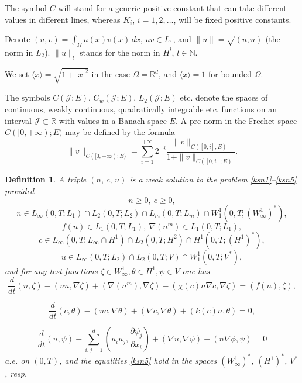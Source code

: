 \documentclass[10pt]{amsart}
\newtheorem{preremark2}{Definition}[section]
\newenvironment{defn}
  {\begin{preremark2}\rm}{\end{preremark2}}
\begin{document}
The symbol $C$ will stand for a generic positive constant that can take different values in different lines, whereas $K_i$, $i=1,2,\dots$, will be fixed positive constants.

Denote $(u,v)=\int_\Omega u(x)v(x)\,dx$, $uv\in L_1$, and $\|u\|=\sqrt{(u,u)}$ (the norm in $L_2$). $\|u\|_l$ stands for the norm in $H^l$, $l\in \mathbb{N}$.

We set ${\langle x \rangle}=\sqrt{1+|x|^2}$ in the case $\Omega={\mathbb{R}}^d$, and ${\langle x \rangle}=1$ for bounded $\Omega$. 

The symbols $C (\mathcal{J}; E) $, $C_w(\mathcal{J}; E)$, $L_2
(\mathcal{J}; E) $ etc. denote the spaces of continu\-ous, weakly continu\-ous, quadratically integrable etc. functions on an interval
$\mathcal{J}\subset \mathbb {R} $ with
values in a Banach space $E $. A pre-norm in the Frechet space $C ([0, +
\infty); E) $ may be defined by the formula
$$ \| v \| _{C ([0, +\infty);E)} =\sum\limits _ {i=1} ^ {+ \infty} 2 ^ {-i} \frac {\|v \| _ {C ([0, i]; E)}} {1 + \| v \| _ {C ([0, i]; E)}}. $$

\begin{defn}\label{defweak}
A triple $(n,\, c,\, u)$ is a \emph{weak
solution} to the problem \eqref{ksn1}--\eqref{ksn5} provided
$$n\geq 0,\ c\geq 0,$$ 
$$
n \in L_{\infty}(0, T; L_{1})\cap L_{2}(0, T; L_{2}) \cap L_{m}(0, T; L_{m}) \cap W^{1}_{1}(0, T; (W^1_\infty)^*),
$$
$$
f(n) \in L_{1}(0, T; L_{1}),\ \nabla(n^m)\in L_{1}(0, T; L_{1}), 
$$
$$
c \in L_{\infty} (0,T; L_{\infty} \cap
H^{1} )\cap 
L_2 (0, T; H^{2})\cap H^{1}(0, T; (H^{1})^*),
$$
$$
u \in L_{\infty}(0, T; L_{2}) \cap L_2(0,
T; V) \cap W^{1}_{1}(0, T; V^*), 
$$
and for any test functions $\zeta\in W^1_\infty,\theta\in H^1, \psi \in V$ one has 
\begin{equation}\label{weak1}
\frac {d}{dt} (n,\zeta) - (u n,\nabla \zeta) +(\nabla(n^m),\nabla\zeta)-(\chi (c) n \nabla c,\nabla \zeta)=(f(n),\zeta),
\end{equation}

\begin{equation}\label{weak2}
\frac {d}{dt} (c,\theta) - (u c,\nabla \theta)+ (\nabla c,\nabla\theta) +(k(c) n,\theta)=0,
\end{equation}

\begin{equation}\label{weak3}
\frac {d}{dt} (u,\psi) - \sum\limits^d _ {i,j=1} \left(u_i u_j, \frac {\partial\psi_j} {\partial x_i}\right) + (\nabla u,\nabla \psi) +(n \nabla
\phi,\psi)=0
\end{equation}
a.e. on $(0,T)$, and the equalities \eqref{ksn5} hold in the spaces $(W^1_\infty)^*$, $(H^{1})^*$, $V^*$, resp.

\end{defn}
\end{document}
